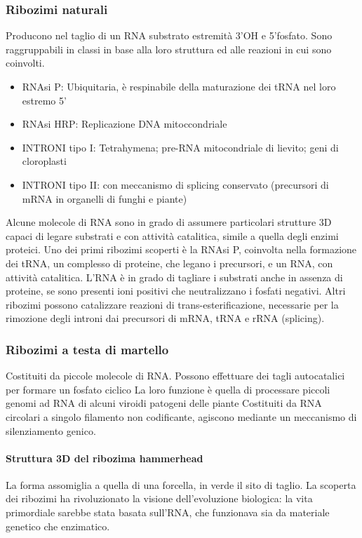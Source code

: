 \documentclass{article}
\begin{document}
\subsubsection{Ribozimi naturali}
Producono nel taglio di un RNA substrato estremità 3'OH e 5'fosfato. Sono raggruppabili in classi in base alla loro struttura ed alle reazioni in cui sono coinvolti.
\begin{itemize}
    \item RNAsi P: Ubiquitaria, è respinabile della maturazione dei tRNA nel loro estremo 5'
    \item RNAsi HRP: Replicazione DNA mitoccondriale
    \item INTRONI tipo I: Tetrahymena; pre-RNA mitocondriale di lievito; geni di cloroplasti
    \item INTRONI tipo II: con meccanismo di splicing conservato (precursori di mRNA in organelli di funghi e piante)
\end{itemize}
Alcune molecole di RNA sono in grado di assumere particolari strutture 3D capaci di legare substrati e con attività catalitica, simile a quella degli enzimi proteici.
Uno dei primi ribozimi scoperti è la RNAsi P, coinvolta nella formazione dei tRNA, un complesso di proteine, che legano i precursori, e un RNA, con attività catalitica.
L'RNA è in grado di tagliare i substrati anche in assenza di proteine, se sono presenti ioni positivi che neutralizzano i fosfati negativi.
Altri ribozimi possono catalizzare reazioni di trans-esterificazione, necessarie per la rimozione degli introni dai precursori di mRNA, tRNA e rRNA (splicing).
\subsubsection{Ribozimi a testa di martello}
Costituiti da piccole molecole di RNA. Possono effettuare dei tagli autocatalici per formare un fosfato ciclico
La loro funzione è quella di processare piccoli genomi ad RNA di alcuni viroidi patogeni delle piante
Costituiti da RNA circolari a singolo filamento non codificante, agiscono mediante un meccanismo di silenziamento genico.\\
\paragraph{Struttura 3D del ribozima hammerhead} La forma assomiglia a quella di una
forcella, in verde il sito di taglio. La scoperta dei ribozimi ha rivoluzionato la visione dell'evoluzione biologica: la vita
primordiale sarebbe stata basata sull'RNA, che funzionava sia da materiale genetico che enzimatico.
\end{document}
